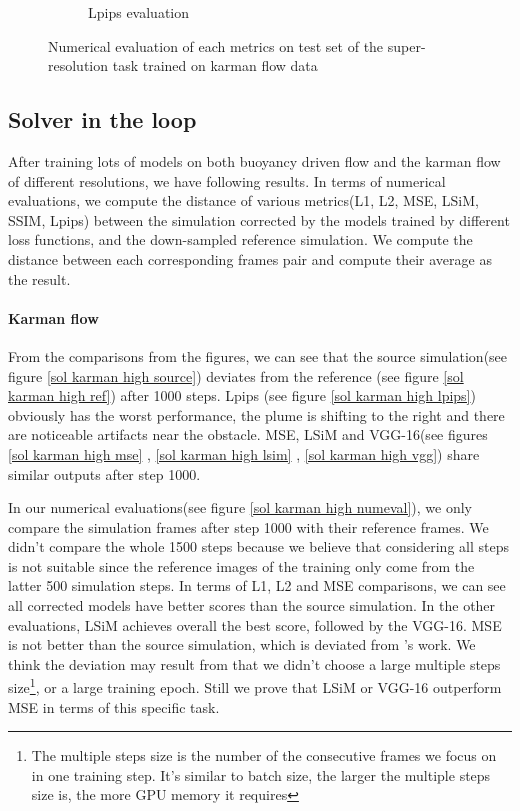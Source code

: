 \documentclass[a4paper,12pt,twoside]{report}
\begin{document}
\begin{figure}
\begin{subfigure}{0.32\textwidth}
		\caption{Lpips evaluation}
	\end{subfigure}
	\caption{Numerical evaluation of each metrics on test set of the super-resolution task trained on karman flow data}
	\label{super karman numeval}
\end{figure}

\subsection{Solver in the loop}
After training lots of models on both buoyancy driven flow and the karman flow of different resolutions, we have following results. In terms of numerical evaluations, we compute the distance of various metrics(L1, L2, MSE, LSiM, SSIM, Lpips) between the simulation corrected by the models trained by different loss functions, and the down-sampled reference simulation. We compute the distance between each corresponding frames pair and compute their average as the result.

\paragraph{Karman flow}
From the comparisons from the figures, we can see that the source simulation(see figure \ref{sol karman high source}) deviates from the reference (see figure \ref{sol karman high ref}) after 1000 steps. Lpips (see figure \ref{sol karman high lpips}) obviously has the worst performance, the plume is shifting to the right and there are noticeable artifacts near the obstacle. MSE, LSiM and VGG-16(see figures \ref{sol karman high mse} , \ref{sol karman high lsim} , \ref{sol karman high vgg})  share similar outputs after step 1000.

In our numerical evaluations(see figure \ref{sol karman high numeval}), we only compare the simulation frames after step 1000 with their reference frames. We didn't compare the whole 1500 steps because we believe that considering all steps is not suitable since the reference images of the training only come from the latter 500 simulation steps. In terms of L1, L2 and MSE comparisons, we can see all corrected models have better scores than the source simulation. In the other evaluations, LSiM achieves overall the best score, followed by the VGG-16. MSE is not better than the source simulation, which is deviated from \citeauthor{um2020sol}'s work. We think the deviation may result from that we didn't choose a large multiple steps size\footnote{The multiple steps size is the number of the consecutive frames we focus on in one training step. It's similar to batch size, the larger the multiple steps size is, the more GPU memory it requires}, or a large training epoch. Still we prove that LSiM or VGG-16 outperform MSE in terms of this specific task.
\end{document}

